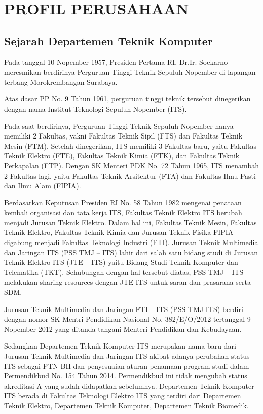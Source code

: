 \chapter{PROFIL PERUSAHAAN}


\section{Sejarah Departemen Teknik Komputer}

Pada tanggal 10 Nopember 1957, Presiden Pertama RI, Dr.Ir. Soekarno meresmikan berdirinya Perguruan Tinggi Teknik Sepuluh Nopember di lapangan terbang Morokrembangan Surabaya.

Atas dasar PP No. 9 Tahun 1961, perguruan tinggi teknik tersebut dinegerikan dengan nama Institut Teknologi Sepuluh Nopember (ITS).

Pada saat berdirinya, Perguruan Tinggi Teknik Sepuluh Nopember hanya memiliki 2 Fakultas, yakni Fakultas Teknik Sipil (FTS) dan Fakultas Teknik Mesin (FTM). Setelah dinegerikan, ITS memiliki 3 Fakultas baru, yaitu Fakultas Teknik Elektro (FTE), Fakultas Teknik Kimia (FTK), dan Fakultas Teknik Perkapalan (FTP). Dengan SK Menteri PDK No. 72 Tahun 1965, ITS menambah 2 Fakultas lagi, yaitu Fakultas Teknik Arsitektur (FTA) dan Fakultas Ilmu Pasti dan Ilmu Alam (FIPIA).

Berdasarkan Keputusan Presiden RI No. 58 Tahun 1982 mengenai penataan kembali organisasi dan tata kerja ITS, Fakultas Teknik Elektro ITS berubah menjadi Jurusan Teknik Elektro. Dalam hal ini, Fakultas Teknik Mesin, Fakultas Teknik Elektro, Fakultas Teknik Kimia dan Jurusan Teknik Fisika FIPIA digabung menjadi Fakultas Teknologi Industri (FTI). Jurusan Teknik Multimedia dan Jaringan ITS (PSS TMJ – ITS) lahir dari salah satu bidang studi di Jurusan Teknik Elektro ITS (JTE – ITS) yaitu Bidang Studi Teknik Komputer dan Telematika (TKT). Sehubungan dengan hal tersebut diatas, PSS TMJ – ITS melakukan sharing resources dengan JTE ITS untuk saran dan prasarana serta SDM.

Jurusan Teknik Multimedia dan Jaringan FTI – ITS (PSS TMJ-ITS) berdiri dengan nomor SK Mentri Pendidikan Nasional No. 382/E/O/2012 tertanggal 9 Nopember 2012 yang ditanda tangani Menteri Pendidikan dan Kebudayaan.

Sedangkan Departemen Teknik Komputer ITS merupakan nama baru dari Jurusan Teknik Multimedia dan Jaringan ITS akibat adanya perubahan status ITS sebagai PTN-BH dan penyesuaian aturan penamaan program studi dalam Permendikbud No. 154 Tahun 2014. Permendikbud ini tidak mengubah status akreditasi A yang sudah didapatkan sebelumnya. Departemen Teknik Komputer ITS berada di Fakultas Teknologi Elektro ITS yang terdiri dari Departemen Teknik Elektro, Departemen Teknik Komputer,  Departemen Teknik Biomedik.


